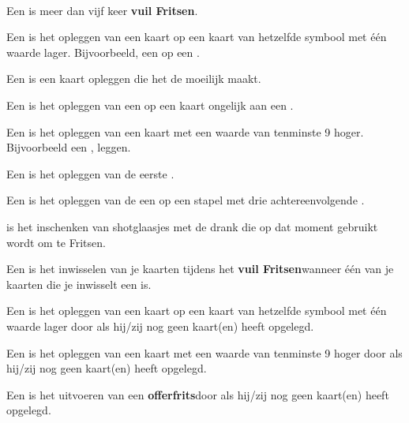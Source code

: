 \newpage
\drawBar{}

\

\item Een  is meer dan vijf keer \textbf{vuil Fritsen}\footnotemark[1].

\item Een  is het opleggen van een kaart op een kaart van hetzelfde symbool met \'e\'en waarde lager. Bijvoorbeeld, een  op een .

\item Een  is een kaart opleggen die het de \andereSpelers moeilijk maakt.

\item Een  is het opleggen van een  op een kaart ongelijk aan een .

\item Een  is het opleggen van een kaart met een waarde van tenminste 9 hoger. Bijvoorbeeld een ,  leggen.

\item Een  is het opleggen van de eerste .

\item Een  is het opleggen van de een  op een stapel met drie achtereenvolgende .

\item {} is het inschenken van shotglaasjes met de drank die op dat moment gebruikt wordt om te Fritsen.

\item Een  is het inwisselen van je kaarten tijdens het \textbf{vuil Fritsen}\footnotemark[1] wanneer één van je kaarten die je inwisselt een  is. 

\item Een  is het opleggen van een kaart op een kaart van hetzelfde symbool met \'e\'en waarde lager door \Willem als hij/zij nog geen kaart(en) heeft opgelegd.

\item Een  is het opleggen van een kaart met een waarde van tenminste 9 hoger door \Willem als hij/zij nog geen kaart(en) heeft opgelegd.

\item Een  is het uitvoeren van een \textbf{offerfrits}\footnotemark[2] door \Willem als hij/zij nog geen kaart(en) heeft opgelegd.

